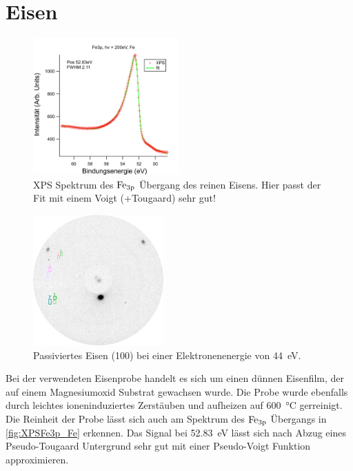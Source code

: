     \section{Eisen}
        \begin{figure}
            \centering
            \includegraphics[width=0.5\textwidth]{./content/pictures/Fe/Fe3p_Fe.png}
            \caption{XPS Spektrum des $\ce{Fe}_{3\text{p}}$ Übergang des reinen Eisens. Hier passt der Fit mit einem Voigt (+Tougaard) sehr gut!}
            \label{fig:XPSFe3p_Fe}
        \end{figure}
        \begin{figure}
            \centering
            \includegraphics[height=5cm]{./content/pictures/pFe/2021_09_07_001_passivatedFe(100)_44eV.png}
            \caption{Passiviertes Eisen (100) bei einer Elektronenenergie von \SI{44}{\electronvolt}.}
            \label{fig:LEED_pFe}
        \end{figure}
        Bei der verwendeten Eisenprobe handelt es sich um einen dünnen Eisenfilm, der auf einem Magnesiumoxid Substrat gewachsen wurde.
        Die Probe wurde ebenfalls durch leichtes ioneninduziertes Zerstäuben und aufheizen auf \SI{600}{\celsius} gerreinigt.
        Die Reinheit der Probe lässt sich auch am Spektrum des $\ce{Fe}_{3\text{p}}$ Übergangs in \autoref{fig:XPSFe3p_Fe} erkennen.
        Das Signal bei \SI{52.83}{\electronvolt} lässt sich nach Abzug eines Pseudo-Tougaard Untergrund sehr gut mit einer Pseudo-Voigt Funktion approximieren.
